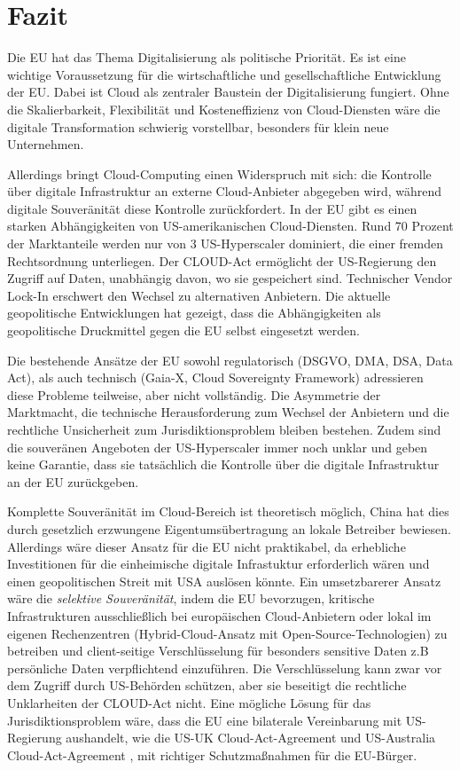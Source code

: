 \chapter{Fazit}

Die \ac{EU} hat das Thema Digitalisierung als politische Priorität. Es ist eine wichtige Voraussetzung für die wirtschaftliche und gesellschaftliche Entwicklung der \ac{EU}. Dabei ist Cloud als zentraler Baustein der Digitalisierung fungiert. Ohne die Skalierbarkeit, Flexibilität und Kosteneffizienz von Cloud-Diensten wäre die digitale Transformation schwierig vorstellbar, besonders für klein neue Unternehmen.

Allerdings bringt Cloud-Computing einen Widerspruch mit sich: die Kontrolle über digitale Infrastruktur an externe Cloud-Anbieter abgegeben wird, während digitale Souveränität diese Kontrolle zurückfordert. In der \ac{EU} gibt es einen starken Abhängigkeiten von US-amerikanischen Cloud-Diensten. Rund 70 Prozent der Marktanteile werden nur von 3 US-Hyperscaler dominiert, die einer fremden Rechtsordnung unterliegen. Der \ac{CLOUD-Act} ermöglicht der US-Regierung den Zugriff auf Daten, unabhängig davon, wo sie gespeichert sind. Technischer Vendor Lock-In erschwert den Wechsel zu alternativen Anbietern. Die aktuelle geopolitische Entwicklungen hat gezeigt, dass die Abhängigkeiten als geopolitische Druckmittel gegen die \ac{EU} selbst eingesetzt werden.

Die bestehende Ansätze der \ac{EU} sowohl regulatorisch (\ac{DSGVO}, \ac{DMA}, \ac{DSA}, Data Act), als auch technisch (Gaia-X, Cloud Sovereignty Framework) adressieren diese Probleme teilweise, aber nicht vollständig. Die Asymmetrie der Marktmacht, die technische Herausforderung zum Wechsel der Anbietern und die rechtliche Unsicherheit zum Jurisdiktionsproblem bleiben bestehen.
Zudem sind die souveränen Angeboten der US-Hyperscaler immer noch unklar und geben keine Garantie, dass sie tatsächlich die Kontrolle über die digitale Infrastruktur an der \ac{EU} zurückgeben. 

Komplette Souveränität im Cloud-Bereich ist theoretisch möglich, China hat dies durch gesetzlich erzwungene Eigentumsübertragung an lokale Betreiber bewiesen. Allerdings wäre dieser Ansatz für die \ac{EU} nicht praktikabel, da erhebliche Investitionen für die einheimische digitale Infrastuktur  erforderlich wären und einen geopolitischen Streit mit \ac{USA} auslösen könnte. Ein umsetzbarerer Ansatz wäre die \textit{selektive Souveränität}, indem die \ac{EU} bevorzugen, kritische Infrastrukturen ausschließlich bei europäischen Cloud-Anbietern oder lokal im eigenen Rechenzentren (Hybrid-Cloud-Ansatz mit Open-Source-Technologien) zu betreiben und client-seitige Verschlüsselung für besonders sensitive Daten z.B persönliche Daten verpflichtend einzuführen. Die Verschlüsselung kann zwar vor dem Zugriff durch US-Behörden schützen, aber sie beseitigt die rechtliche Unklarheiten der \ac{CLOUD-Act} nicht. Eine mögliche Lösung für das Jurisdiktionsproblem wäre, dass die \ac{EU} eine bilaterale Vereinbarung mit US-Regierung aushandelt, wie die US-UK Cloud-Act-Agreement \cite{us_uk_cloud_act_2019} und US-Australia Cloud-Act-Agreement \cite{us_aus_cloud_act_2021}, mit richtiger Schutzmaßnahmen für die \ac{EU}-Bürger.

